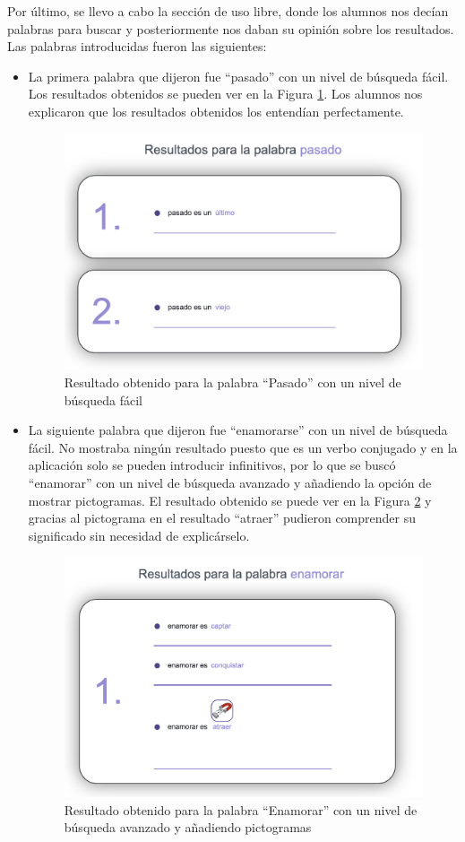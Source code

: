 Por último, se llevo a cabo la sección de uso libre, donde los alumnos nos decían palabras para buscar y posteriormente nos daban su opinión sobre los resultados. Las palabras introducidas fueron las siguientes:
\begin{itemize}
	\item La primera palabra que dijeron fue ``pasado'' con un nivel de búsqueda fácil. Los resultados obtenidos se pueden ver en la Figura \ref{fig:pasadoFacil}. Los alumnos nos explicaron que los resultados obtenidos los entendían perfectamente.
	\begin{figure}[!h]
		\includegraphics[width=.7\textwidth]{Imagenes/Bitmap/Capitulo4/EvaluacionFinal/1pasadofacil.png}
		\centering
		\caption{Resultado obtenido para la palabra ``Pasado'' con un nivel de búsqueda fácil}
		\label{fig:pasadoFacil}
	\end{figure}
	\item La siguiente palabra que dijeron fue ``enamorarse'' con un nivel de búsqueda fácil. No mostraba ningún resultado puesto que es un verbo conjugado y en la aplicación solo se pueden introducir infinitivos, por lo que se buscó ``enamorar'' con un nivel de búsqueda avanzado y añadiendo la opción de mostrar pictogramas. El resultado obtenido se puede ver en la Figura \ref{fig:enamorarAvanzado} y gracias al pictograma en el resultado ``atraer'' pudieron comprender su significado sin necesidad de explicárselo.
	\begin{figure}[!h]
		\includegraphics[width=.7\textwidth]{Imagenes/Bitmap/Capitulo4/EvaluacionFinal/2enamoraravanzado.png}
		\centering
		\caption{Resultado obtenido para la palabra ``Enamorar'' con un nivel de búsqueda avanzado y añadiendo pictogramas}
		\label{fig:enamorarAvanzado}
	\end{figure}
	

\end{itemize}
